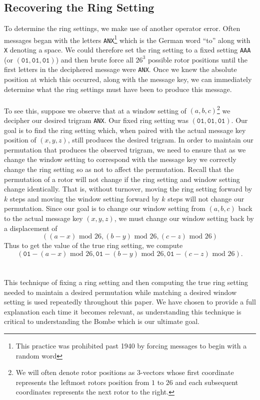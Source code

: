 \subsection{Recovering the Ring Setting}\label{cyclometer_ring_setting}
To determine the ring settings, we make use of another operator
error. Often messages began with the letters
\texttt{ANX}\footnote{This practice was prohibited past 1940 by
forcing messages to begin with a random word} which is
the German word ``to'' along with \texttt{X} denoting a space. We
could therefore set the ring setting to a fixed setting \texttt{AAA} (or $(\texttt{01}, \texttt{01}, \texttt{01})$) and then
brute force all $26^3$ possible rotor positions until the first
letters in the deciphered message were \texttt{ANX}. Once we knew the
absolute position at which this occurred, along with the message key,
we can immediately determine what the ring settings must have been to
produce this message. 
\\\\To see this, suppose we observe that at a window setting of $(a,b,c)$\footnote{We will often denote rotor positions as $3$-vectors whose first coordinate represents the leftmost rotors position from $1$ to $26$ and each subsequent coordinates represents the next rotor to the right.} we decipher our desired trigram \texttt{ANX}.
Our fixed ring setting was
$(\texttt{01}, \texttt{01}, \texttt{01})$. Our goal is to find the ring setting which, when paired with the actual message key position of $(x,y,z)$, still produces the desired trigram. In order to
maintain our permutation that produces the observed trigram, we need
to ensure that as we change the window setting to correspond with the message key we correctly change the ring setting so as not
to affect the permutation. Recall that the permutation of a rotor
will not change if the ring setting and window setting change
identically. That is, without turnover, moving the ring setting
forward by $k$ steps and moving the window setting forward by $k$
steps will not change our permutation. Since our goal is to change
our window setting from $(a,b,c)$ back to the actual message key
$(x,y,z)$, we must change our window setting back by a displacement of
\[
  ((a-x)\text{ mod } 26, (b-y)\text{ mod }26, (c-z)\text{ mod }26)
\]
Thus to get the value of the true ring setting, we compute
\[
  (\texttt{01} - (a- x)\text{ mod }26, \texttt{01} - (b- y)\text{ mod
    }26, \texttt{01} - (c-
  z)\text{ mod }26).
\]
\\\\This technique of fixing a ring setting and then computing the true ring setting needed to maintain a desired permutation while matching a desired window setting is used repeatedly throughout this paper. We have chosen to provide a full explanation each time it becomes relevant, as understanding this technique is critical to understanding the Bombe which is our ultimate goal.
